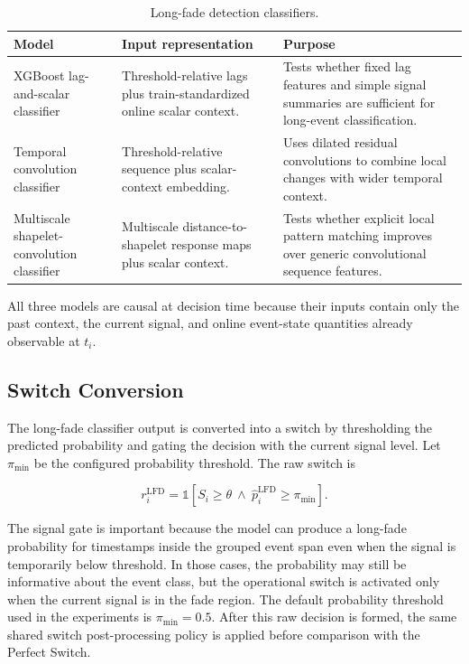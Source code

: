 \begin{table}[htbp]
  \centering
  \small
  \caption{Long-fade detection classifiers.}
  \label{tab:long-fade-models}
  \renewcommand{\arraystretch}{1.25}
  \setlength{\tabcolsep}{3pt}
  \begin{tabular}{@{}>{\raggedright\arraybackslash}p{}
    >{\raggedright\arraybackslash}p{}
    >{\raggedright\arraybackslash}p{}@{}}
    \toprule
    Model & Input representation & Purpose \\
    \midrule
    XGBoost lag-and-scalar classifier
      & Threshold-relative lags plus train-standardized online scalar context.
      & Tests whether fixed lag features and simple signal summaries are
        sufficient for long-event classification. \\
    Temporal convolution classifier
      & Threshold-relative sequence plus scalar-context embedding.
      & Uses dilated residual convolutions to combine local changes with wider
        temporal context. \\
    Multiscale shapelet-convolution classifier
      & Multiscale distance-to-shapelet response maps plus scalar context.
      & Tests whether explicit local pattern matching improves over generic
        convolutional sequence features. \\
    \bottomrule
  \end{tabular}
\end{table}

All three models are causal at decision time because their inputs contain only
the past context, the current signal, and online event-state quantities already
observable at \(t_i\).

\subsection{Switch Conversion}
The long-fade classifier output is converted into a switch by thresholding the
predicted probability and gating the decision with the current signal level. Let
\(\pi_{\min}\) be the configured probability threshold. The raw switch is

\[
  r_i^{\text{LFD}}
  =
  \mathbb{1}
  \left[
    S_i \ge \theta
    \ \land\
    \widehat{p}_i^{\text{LFD}} \ge \pi_{\min}
  \right].
\]

The signal gate is important because the model can produce a long-fade
probability for timestamps inside the grouped event span even when the signal is
temporarily below threshold. In those cases, the probability may still be
informative about the event class, but the operational switch is activated only
when the current signal is in the fade region. The default probability threshold
used in the experiments is \(\pi_{\min}=0.5\). After this raw decision is
formed, the same shared switch post-processing policy is applied before
comparison with the Perfect Switch.

